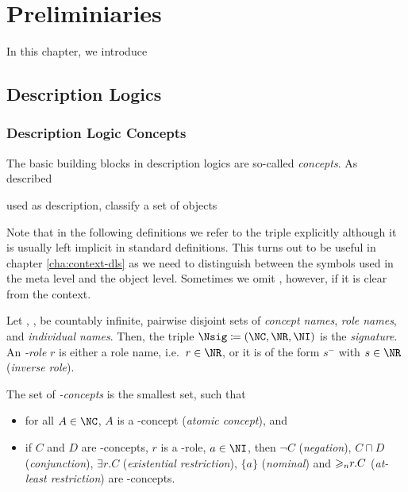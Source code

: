 
\chapter{Preliminiaries}
\label{cha:preliminiaries}

In this chapter, we introduce 



\section{Description Logics}
\label{sec:description-logics}


\subsection{Description Logic Concepts}
\label{sec:dl-concepts}


The basic building blocks in description logics are so-called \emph{concepts}. As described

used as description, classify a set of objects

Note that in the following definitions we refer to the triple \Nsig explicitly although it is
usually left implicit in standard definitions.  This turns out to be useful in chapter
\ref{cha:context-dls} as we need to distinguish between the symbols used in the meta level and the
object level.  Sometimes we omit \Nsig, however, if it is clear from the context.
%

\begin{definition}
  \label{def:syntax-concepts}
  Let \NC, \NR, \NI be countably infinite, pairwise disjoint sets of \emph{concept names}, \emph{role names},
  and \emph{individual names}. Then, the triple $\Nsig\coloneqq(\NC,\NR,\NI)$ is the
  \emph{signature}. An \emph{\Nsig-role} $r$ is either a role name, i.e.~$r\in\NR$, or it is of the
  form $s^{-}$ with $s\in\NR$ (\emph{inverse role}).

  The set of \emph{\Nsig-concepts} is the smallest set, such that
  \begin{itemize}
  \item for all $A\in\NC$, $A$ is a \Nsig-concept (\emph{atomic concept}), and
  \item if $C$ and $D$ are \Nsig-concepts, $r$ is a \Nsig-role, $a\in\NI$, then $\lnot C$ (\emph{negation}),
    $C\sqcap D$ (\emph{conjunction}), $\exists r.C$ (\emph{existential restriction}), $\{a\}$
    (\emph{nominal}) and ${\geqslant_{n}}r.C$ (\emph{at-least restriction}) are \Nsig-concepts. \qedhere
  \end{itemize}
\end{definition}

